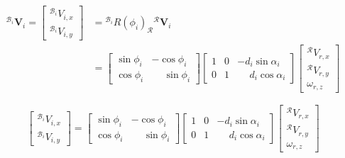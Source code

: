 \documentclass[11pt,a4paper]{article}
\newcommand{\vect}[1]{\bm{#1}}       %
\newcommand{\frameR}{\mathcal{R}}
\newcommand{\frameBi}{\mathcal{B}_i}
\begin{document}
\begin{equation}
    \begin{aligned}
        {}^{\frameBi} \vect{V}_i = \begin{bmatrix}
                                       {}^{\frameBi}V_{i,x} \\
                                       {}^{\frameBi}V_{i,y}
                                   \end{bmatrix} & = {}^{\frameBi}  R(\phi_i)_{\frameR} {}^\frameR \vect{V}_{i} \\
                                                   & = \begin{bmatrix}
                                                           \sin\phi_i & -\cos\phi_i           \\
                                                           \cos\phi_i & \phantom{-}\sin\phi_i
                                                       \end{bmatrix} \begin{bmatrix}
                                                                         1 & 0 & -d_{i} \sin\alpha_i           \\
                                                                         0 & 1 & \phantom{-}d_{i} \cos\alpha_i
                                                                     \end{bmatrix} \begin{bmatrix}
                                                                                       {}^\frameR V_{r,x} \\
                                                                                       {}^\frameR V_{r,y} \\
                                                                                       \omega_{r,z}
                                                                                   \end{bmatrix}
    \end{aligned}
\end{equation}

\begin{equation}
    \begin{bmatrix}
        {}^{\frameBi}V_{i,x} \\
        {}^{\frameBi}V_{i,y}
    \end{bmatrix} = \begin{bmatrix}
        \sin\phi_i & -\cos\phi_i           \\
        \cos\phi_i & \phantom{-}\sin\phi_i
    \end{bmatrix} \begin{bmatrix}
        1 & 0 & -d_{i} \sin\alpha_i           \\
        0 & 1 & \phantom{-}d_{i} \cos\alpha_i
    \end{bmatrix} \begin{bmatrix}
        {}^\frameR V_{r,x} \\
        {}^\frameR V_{r,y} \\
        \omega_{r,z}
    \end{bmatrix}
    \label{eq:wheel-constraints-compact}
\end{equation}
\end{document}
